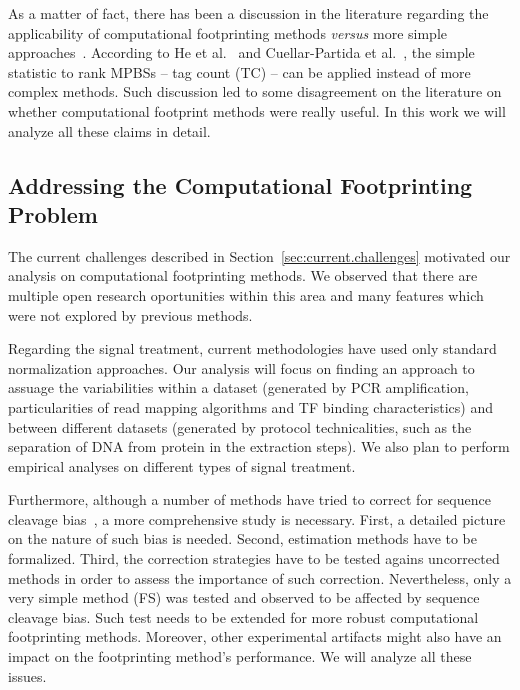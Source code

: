 As a matter of fact, there has been a discussion in the literature regarding the applicability of computational footprinting methods \emph{versus} more simple approaches~\cite{he2014,meyer2014}. According to He et al.~\cite{he2014} and Cuellar-Partida et al.~\cite{cuellar2012}, the simple statistic to rank MPBSs -- tag count (TC) -- can be applied instead of more complex methods. Such discussion led to some disagreement on the literature on whether computational footprint methods were really useful. In this work we will analyze all these claims in detail.

\subsection{Addressing the Computational Footprinting Problem}
\label{sec:addressing.computational.footprinting}

The current challenges described in Section~\ref{sec:current.challenges} motivated our analysis on computational footprinting methods. We observed that there are multiple open research oportunities within this area and many features which were not explored by previous methods.

Regarding the signal treatment, current methodologies have used only standard normalization approaches. Our analysis will focus on finding an approach to assuage the variabilities within a dataset (generated by PCR amplification, particularities of read mapping algorithms and TF binding characteristics) and between different datasets (generated by protocol technicalities, such as the separation of DNA from protein in the extraction steps). We also plan to perform empirical analyses on different types of signal treatment.

Furthermore, although a number of methods have tried to correct for sequence cleavage bias~\cite{hesselberth2009,yardimci2014,sung2014}, a more comprehensive study is necessary. First, a detailed picture on the nature of such bias is needed. Second, estimation methods have to be formalized. Third, the correction strategies have to be tested agains uncorrected methods in order to assess the importance of such correction. Nevertheless, only a very simple method (FS) was tested and observed to be affected by sequence cleavage bias. Such test needs to be extended for more robust computational footprinting methods. Moreover, other experimental artifacts might also have an impact on the footprinting method's performance. We will analyze all these issues.

